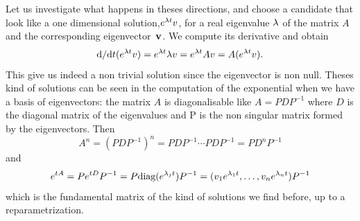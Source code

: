 Let us investigate what happens in theses directions, and choose a candidate that look like a one dimensional solution,$e^{\lambda t}v$, for a real eigenvalue $\lambda$ of the matrix $A$ and the corresponding eigenvector~$\mathbf{v}$. We compute its derivative and obtain 
\[\mathrm{d}/{\mathrm{d} t}(e^{\lambda t}v) =  e^{\lambda t}\lambda v = e^{\lambda t}Av = A(e^{\lambda t}v).\]
This give us indeed a non trivial solution since the eigenvector is non null. Theses kind of solutions can be seen in the computation of the exponential when we have a basis of eigenvectors: the matrix $A$ is diagonalisable like $A=PDP^{-1}$ where $D$ is the diagonal matrix of the eigenvalues and P is the non singular matrix formed by the eigenvectors. Then 
\[ A^n= (PDP^{-1})^n = PDP^{-1}\cdots PDP^{-1} = PD^nP^{-1} \]
and 
\[ e^{tA} 
= Pe^{tD}P^{-1} 
= P\text{diag}(e^{\lambda_jt})P^{-1} 
= (v_1e^{\lambda_1t},\dots,v_ne^{\lambda_nt})P^{-1} 
\]
which is the fundamental matrix of the kind of solutions we find before, up to a reparametrization.

